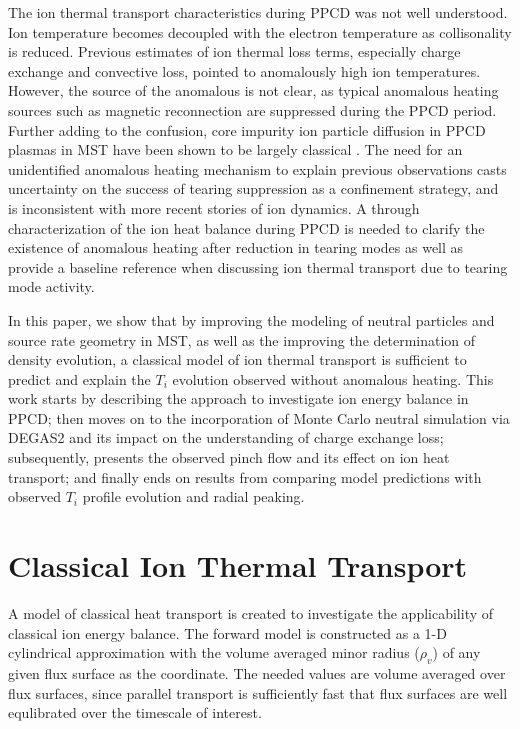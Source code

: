 \documentclass[aip, pop, preprint]{revtex4-1}
\begin{document}
The ion thermal transport characteristics during PPCD was not well understood.
Ion temperature becomes decoupled with the electron temperature as
collisonality is reduced. Previous estimates of ion thermal loss terms,
especially charge exchange and convective loss, pointed to anomalously high ion
temperatures\cite{Fiksel2006,BiewerThesis,Wyman2007}.
However, the source of the anomalous is not clear, as typical anomalous heating 
sources such as magnetic reconnection are suppressed during the PPCD period.
Further adding to the confusion, core impurity ion particle diffusion in PPCD
plasmas in MST have been shown to be largely classical \cite{Kumar2012}. The
need for an unidentified anomalous heating mechanism to explain previous observations casts uncertainty on the success of
tearing suppression as a confinement strategy, and is inconsistent with more recent stories of ion dynamics.
A through characterization of the ion heat balance during PPCD is needed to clarify the existence of anomalous heating after reduction in tearing modes as well as provide a baseline reference when discussing ion thermal transport due to tearing mode activity. 



In this paper, we show that by improving the modeling of neutral particles and source rate geometry in
MST, as well as the improving the determination of density evolution,
a classical model of ion thermal transport is sufficient
to predict and explain the $T_i$ evolution observed without anomalous heating. 
This work starts by describing the approach to investigate ion energy balance in PPCD; then moves
on to the incorporation of Monte Carlo neutral simulation via DEGAS2 and its
impact on the understanding of charge exchange loss; subsequently, presents the
observed pinch flow and its effect on ion heat transport; and finally ends
on results from comparing model predictions with observed $T_{i}$ profile
evolution and radial peaking.

\section{Classical Ion Thermal Transport}

A model of classical heat transport is created to investigate the applicability
of classical ion energy balance. 
The forward model is constructed as a 1-D cylindrical approximation with the
volume averaged minor radius ($ \rho_v $) of any given flux surface as the
coordinate. The needed values are volume averaged over flux surfaces, since
parallel transport is sufficiently fast that flux surfaces are well equlibrated over the timescale of interest.
\end{document}

